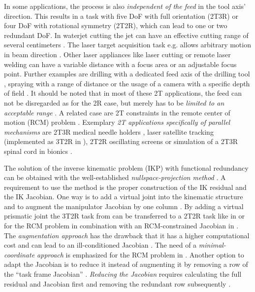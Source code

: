 \documentclass[graybox,vecphys]{svmult}
\begin{document}
In some applications, the process is also \emph{independent of the feed} in the tool axis' direction. 
This results in a task with five DoF with full orientation (2T3R) or four DoF with rotational symmetry (2T2R), which can lead to one or two redundant DoF. 
In waterjet cutting the jet can have an effective cutting range of several centimeters \cite{BahlsFroHelDeu2017}. 
The laser target acquisition task e.g. allows arbitrary motion in beam direction \cite{ChenMcIYi2003}.
Other laser appliances like laser cutting \cite{DolguiPas2009} or remote laser welding \cite{ErdoesKarKem2015} can have a variable distance with a focus area or an adjustable focus point.
Further examples are drilling with a dedicated feed axis of the drilling tool \cite{KoblerKotLexMaj2014}, spraying with a range of distance \cite{FromGra2010} or the usage of a camera with a specific depth of field \cite{GuetaCheChiAra2011}. 
It should be noted that in most of these 2T applications, the feed can not be disregarded as for the 2R case, but merely has to be \emph{limited to an acceptable range} \cite{GuetaCheChiAra2011}.
A related case are 2T constraints in the remote center of motion (RCM) problem \cite{SadeghianZokJaz2019, SandovalPoiVie2017}.
%
Exemplary \emph{2T applications specifically of parallel mechanisms} are 2T3R medical needle holders \cite{KumarPicBay2014}, laser satellite tracking (implemented as 3T2R in \cite{ChenMcIYi2003}), 2T2R oscillating screens \cite{YeFanGuoQu2014} or simulation of a 2T3R spinal cord in bionics \cite{ZhuHuaZha2009}.

The solution of the inverse kinematic problem (IKP) with functional redundancy can be obtained with the well-established \emph{nullspace-projection method} \cite{SciaviccoSic2000}. 
A requirement to use the method is the proper construction of the IK residual and the IK Jacobian.
One way is to add a virtual joint into the kinematic structure and to augment the manipulator Jacobian by one column \cite{Baron2000}. 
By adding a virtual prismatic joint the 3T2R task from \cite{Baron2000} can be transferred to a 2T2R task like in \cite{ErdoesKarKem2015} or for the RCM problem in combination with an RCM-constrained Jacobian in \cite{SadeghianZokJaz2019}.
The \emph{augmentation approach} has the drawback that it has a higher computational cost and can lead to an ill-conditioned Jacobian \cite{HuoBar2008}.
The need of a \emph{minimal-coordinate approach} is emphasized for the RCM problem in \cite{SandovalPoiVie2017}.
Another option to adapt the Jacobian is to reduce it instead of augmenting it by removing a row of the ``task frame Jacobian'' \cite{Zlajpah2017}. 
\emph{Reducing the Jacobian} requires calculating the full residual and Jacobian first and removing the redundant row subsequently \cite{SchapplerTapOrt2019a}. 
\end{document}

